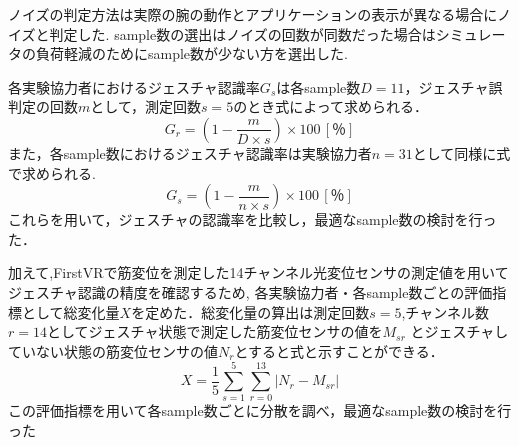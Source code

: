 \documentclass{ltjsreport}
\begin{document}
		ノイズの判定方法は実際の腕の動作とアプリケーションの表示が異なる場合にノイズと判定した.
		sample数の選出はノイズの回数が同数だった場合はシミュレータの負荷軽減のためにsample数が少ない方を選出した.

		各実験協力者におけるジェスチャ認識率$G_{s}$は各sample数$D = 11$，ジェスチャ誤判定の回数$m$として，測定回数$s = 5$のとき式によって求められる．
		\begin{equation}
			\label{eq:gestureprobability1}
			G_{r} = \left( 1-\frac{m}{D \times s} \right) \times 100 \, [％]
		\end{equation}
		また，各sample数におけるジェスチャ認識率は実験協力者$n = 31$として同様に式で求められる.
		\begin{equation}
			\label{eq:gestureprobability2}
			G_{s} = \left( 1-\frac{m}{n \times s} \right) \times 100 \, [％]
		\end{equation}
		これらを用いて，ジェスチャの認識率を比較し，最適なsample数の検討を行った．
		
		加えて,FirstVRで筋変位を測定した14チャンネル光変位センサの測定値を用いてジェスチャ認識の精度を確認するため,
		各実験協力者・各sample数ごとの評価指標として総変化量$X$を定めた．総変化量の算出は測定回数$s = 5$,チャンネル数$r = 14$としてジェスチャ状態で測定した筋変位センサの値を$M_{{s}{r}}$
		とジェスチャしていない状態の筋変位センサの値$N_{r}$とすると式と示すことができる．
		\begin{equation}
			\label{eq:originaldata}
			X = \frac{1}{5} \sum_{s = 1}^{5} \sum_{r = 0}^{13} |N_{r} - M_{{s}{r}}|
		\end{equation}
		この評価指標を用いて各sample数ごとに分散を調べ，最適なsample数の検討を行った
\end{document}
